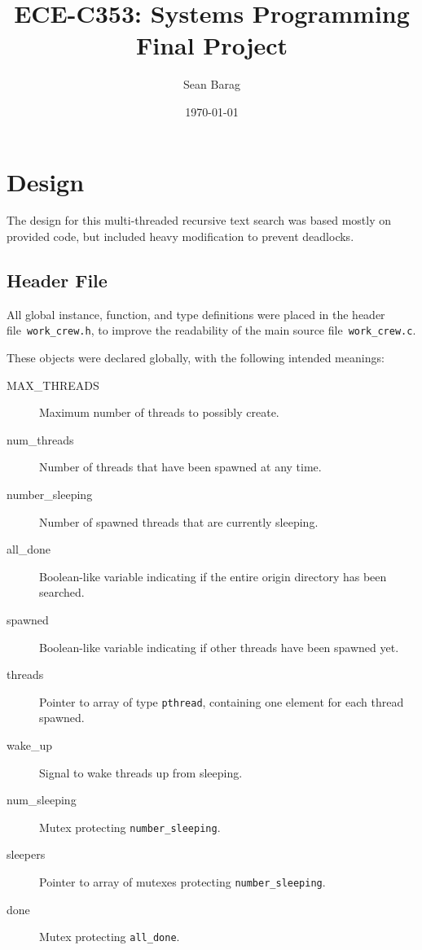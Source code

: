 \documentclass{article}
\title{ECE-C353: Systems Programming \\ Final Project}
\author{Sean Barag \\ \ttt{<sjb89@drexel.edu>}}
\date{\today}
\newcommand{\hlst}[2]{
	\begin{center}
	\parbox{.6\textwidth}{
	}
	\end{center}
}
\newcommand{\ttt}[1]{\texttt{#1}}
\begin{document}
\maketitle
\tableofcontents
\newpage
\section{Design}
The design for this multi-threaded recursive text search was based mostly on
provided code, but included heavy modification to prevent deadlocks.

\subsection{Header File}
All global instance, function, and type definitions were placed in the header
file~\ttt{work\_crew.h}, to improve the readability of the main source
file~\ttt{work\_crew.c}.
%
\hlst{1}{10}
%
These objects were declared globally, with the following intended meanings:
%
\begin{center}
\parbox{.85\textwidth}{
\begin{description}
	\item[MAX\_THREADS]{Maximum number of threads to possibly create.}
	\item[num\_threads]{Number of threads that have been spawned at any time.}
	\item[number\_sleeping]{Number of spawned threads that are currently sleeping.}
	\item[all\_done]{Boolean-like variable indicating if the entire origin directory has been searched.}
	\item[spawned]{Boolean-like variable indicating if other threads have been spawned yet.}
	\item[threads]{Pointer to array of type \ttt{pthread}, containing one element for each thread spawned.}
	\item[wake\_up]{Signal to wake threads up from sleeping.}
	\item[num\_sleeping]{Mutex protecting \ttt{number\_sleeping}.}
	\item[sleepers]{Pointer to array of mutexes protecting \ttt{number\_sleeping}.}
	\item[done]{Mutex protecting \ttt{all\_done}.}
\end{description}
}
\end{center}
\end{document}
